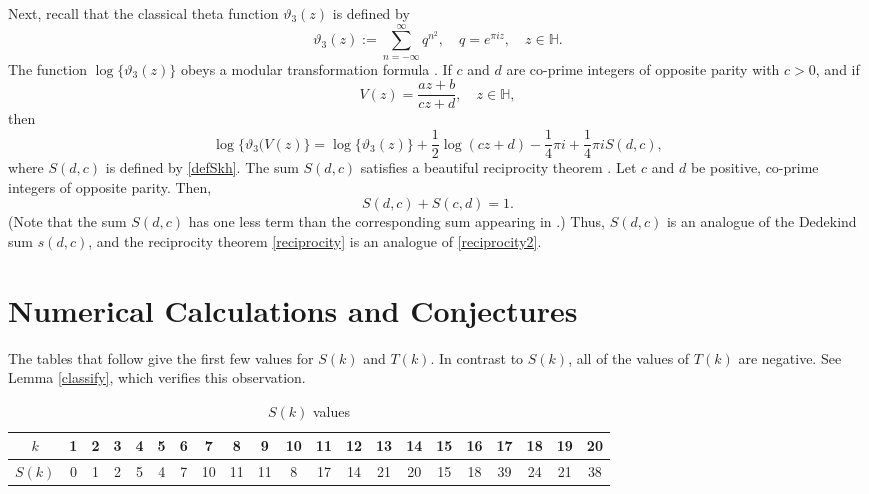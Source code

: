 \documentclass[11pt,reqno]{amsart}
\newcommand{\df}{\dfrac}
\theoremstyle{plain}
\numberwithin{equation}{section}
\newtheorem{theorem}{Theorem}[section]
\begin{document}
 Next, recall that the classical theta function $\vartheta_3(z)$ is defined by
\begin{equation*}
\vartheta_3(z):=\sum_{n=-\infty}^{\infty}q^{n^2}, \quad q=e^{\pi iz}, \quad z\in \mathbb{H}.
\end{equation*}
The function  $\log\{\vartheta_3(z)\}$ obeys a modular transformation formula  \cite[p.~339, Theorem 4.1]{berndt-eisenstein}.
 If $c$ and $d$ are co-prime integers of opposite parity with $c>0$, and if
$$V(z)=\df{az+b}{cz+d}, \quad z\in\mathbb{H},$$
then
\begin{equation*}
\log\{\vartheta_3(V(z)\}=\log\{\vartheta_3(z)\}+\frac12\log(cz+d)-\frac14 \pi i + \frac14 \pi i S(d,c),
\end{equation*}
where $S(d,c)$ is defined by \eqref{defSkh}.
The sum $S(d,c)$ satisfies a beautiful reciprocity theorem \cite[p.~339, Theorem 4.2]{berndt-eisenstein}.  Let $c$ and $d$ be positive, co-prime integers of opposite parity.  Then,
\begin{equation}\label{reciprocity}
S(d,c)+S(c,d)=1.
\end{equation}
(Note that the sum $S(d,c)$ has one less term than the corresponding sum appearing in \cite[p.~339]{berndt-eisenstein}.)
 Thus,  $S(d,c)$ is an analogue of the Dedekind sum $s(d,c)$, and   the reciprocity theorem \eqref{reciprocity} is an analogue of \eqref{reciprocity2}.


\section{Numerical Calculations and Conjectures}\label{conjectures}

The tables that follow give the first few values for $S(k)$ and $T(k)$.  In contrast to $S(k)$, all of the values of $T(k)$ are negative. See Lemma \ref{classify}, which verifies this observation.

\begin{table}[!htb]
  \caption{$S(k)$ values}
  \centering
  \small %
  \setlength{\tabcolsep}{3pt} %
  \begin{tabular}{|c|c|c|c|c|c|c|c|c|c|c|c|c|c|c|c|c|c|c|c|c|}
    \hline
    \textbf{$k$}& 1& 2& 3& 4& 5& 6& 7& 8& 9& 10& 11& 12& 13& 14& 15& 16& 17& 18& 19& 20\\
    \hline
    \textbf{$S(k)$} &0 & 1& 2& 5& 4& 7& 10& 11& 11& 8& 17& 14& 21& 20& 15& 18& 39& 24& 21& 38\\
    \hline
  \end{tabular}
\end{table}
\end{document}
